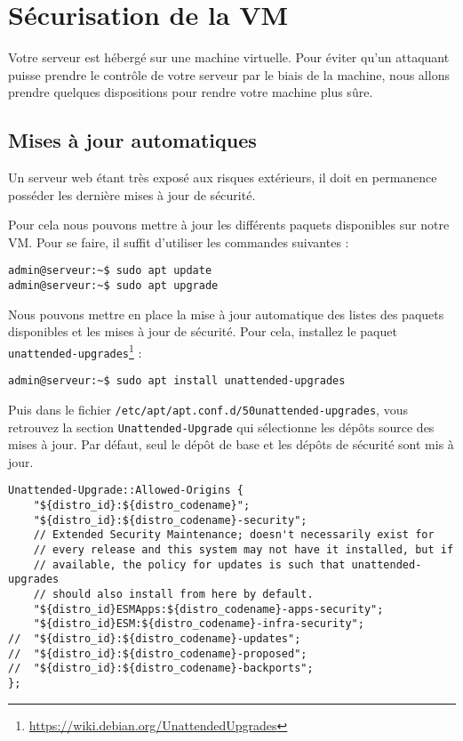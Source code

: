 \section{Sécurisation de la VM}
Votre serveur est hébergé sur une machine virtuelle. Pour éviter qu'un attaquant puisse prendre le contrôle de votre serveur par le biais de la machine, nous allons prendre quelques dispositions pour rendre votre machine plus sûre. 

\subsection{Mises à jour automatiques}
Un serveur web étant très exposé aux risques extérieurs, il doit en permanence posséder les dernière mises à jour de sécurité.

Pour cela nous pouvons mettre à jour les différents paquets disponibles sur notre VM. Pour se faire, il suffit d'utiliser les commandes suivantes :
\begin{verbatim}
admin@serveur:~$ sudo apt update
admin@serveur:~$ sudo apt upgrade
\end{verbatim}

Nous pouvons mettre en place la mise à jour automatique des listes des paquets disponibles et les mises à jour de sécurité. Pour cela, installez le paquet \texttt{unattended-upgrades}\footnote{\url{https://wiki.debian.org/UnattendedUpgrades}} : 
\begin{verbatim}
admin@serveur:~$ sudo apt install unattended-upgrades
\end{verbatim}
Puis dans le fichier \texttt{/etc/apt/apt.conf.d/50unattended-upgrades}, vous retrouvez la section \texttt{Unattended-Upgrade} qui sélectionne les dépôts source des mises à jour. Par défaut, seul le dépôt de base et les dépôts de sécurité sont mis à jour.
\begin{verbatim}
Unattended-Upgrade::Allowed-Origins {
	"${distro_id}:${distro_codename}";
	"${distro_id}:${distro_codename}-security";
	// Extended Security Maintenance; doesn't necessarily exist for
	// every release and this system may not have it installed, but if
	// available, the policy for updates is such that unattended-upgrades
	// should also install from here by default.
	"${distro_id}ESMApps:${distro_codename}-apps-security";
	"${distro_id}ESM:${distro_codename}-infra-security";
//	"${distro_id}:${distro_codename}-updates";
//	"${distro_id}:${distro_codename}-proposed";
//	"${distro_id}:${distro_codename}-backports";
};
\end{verbatim}

